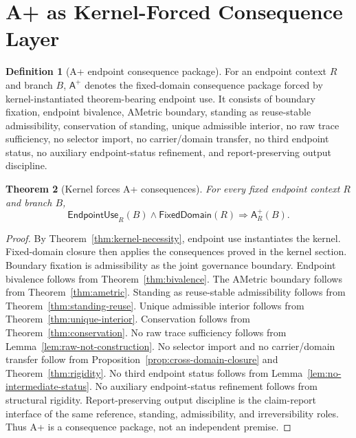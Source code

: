 \documentclass[11pt]{article}
\newtheorem{theorem}{Theorem}[section]
\theoremstyle{definition}
\newtheorem{definition}[theorem]{Definition}
\theoremstyle{remark}
\newcommand{\Aplus}{\mathsf{A}^{+}}
\newcommand{\EndpointUse}{\mathsf{EndpointUse}}
\newcommand{\FixedDom}{\mathsf{FixedDomain}}
\begin{document}
\section{A+ as Kernel-Forced Consequence Layer}\label{sec:aplus-endpoint-consequence-layer}

\begin{definition}[A+ endpoint consequence package]\label{def:aplus-certificate}
For an endpoint context \(R\) and branch \(B\), \(\Aplus\) denotes the fixed-domain consequence package forced by kernel-instantiated theorem-bearing endpoint use. It consists of boundary fixation, endpoint bivalence, AMetric boundary, standing as reuse-stable admissibility, conservation of standing, unique admissible interior, no raw trace sufficiency, no selector import, no carrier/domain transfer, no third endpoint status, no auxiliary endpoint-status refinement, and report-preserving output discipline.
\end{definition}

\begin{theorem}[Kernel forces A+ consequences]\label{thm:a-plus}
For every fixed endpoint context \(R\) and branch \(B\),
\[
  \EndpointUse_R(B)\wedge \FixedDom(R)\Rightarrow \Aplus_R(B).
\]
\end{theorem}

\begin{proof}
By Theorem~\ref{thm:kernel-necessity}, endpoint use instantiates the kernel. Fixed-domain closure then applies the consequences proved in the kernel section. Boundary fixation is admissibility as the joint governance boundary. Endpoint bivalence follows from Theorem~\ref{thm:bivalence}. The AMetric boundary follows from Theorem~\ref{thm:ametric}. Standing as reuse-stable admissibility follows from Theorem~\ref{thm:standing-reuse}. Unique admissible interior follows from Theorem~\ref{thm:unique-interior}. Conservation follows from Theorem~\ref{thm:conservation}. No raw trace sufficiency follows from Lemma~\ref{lem:raw-not-construction}. No selector import and no carrier/domain transfer follow from Proposition~\ref{prop:cross-domain-closure} and Theorem~\ref{thm:rigidity}. No third endpoint status follows from Lemma~\ref{lem:no-intermediate-status}. No auxiliary endpoint-status refinement follows from structural rigidity. Report-preserving output discipline is the claim-report interface of the same reference, standing, admissibility, and irreversibility roles. Thus A+ is a consequence package, not an independent premise.
\end{proof}
\end{document}
